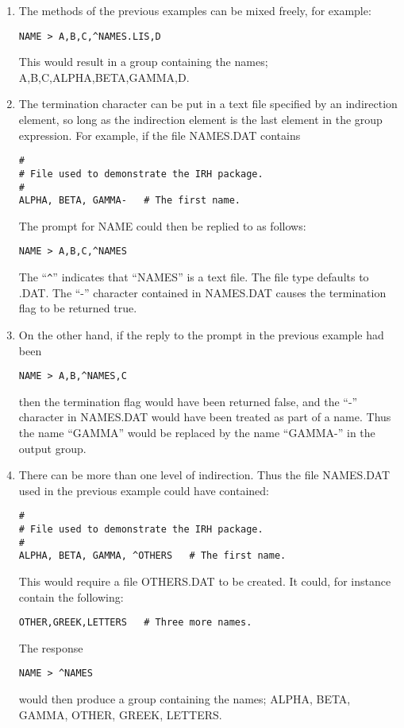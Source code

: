 \begin{enumerate}
\item The methods of the previous examples can be mixed freely, for example:
\begin{verbatim}
NAME > A,B,C,^NAMES.LIS,D
\end{verbatim}
This would result in a group containing the names; A,B,C,ALPHA,BETA,GAMMA,D.

\item The termination character can be put in a text file specified by an 
indirection element, so long as the indirection element is the last element in 
the group expression. For example, if the file NAMES.DAT contains
\begin{verbatim}
#  
# File used to demonstrate the IRH package.
#
ALPHA, BETA, GAMMA-   # The first name.
\end{verbatim}
The prompt for NAME could then be replied to as follows:
\begin{verbatim}
NAME > A,B,C,^NAMES
\end{verbatim}
The ``\verb+^+'' indicates that ``NAMES'' is a text file. The file type defaults to 
.DAT. The ``-'' character contained in NAMES.DAT causes the termination flag to 
be returned true.

\item 
On the other hand, if the reply to the prompt in the previous example had been
\begin{verbatim}
NAME > A,B,^NAMES,C
\end{verbatim}
then the termination flag would have been returned false, and the ``-'' 
character in NAMES.DAT would have been treated as part of a name. Thus the
name ``GAMMA'' would be replaced by the name ``GAMMA-'' in the output group.

\item 
There can be more than one level of indirection. Thus the file NAMES.DAT used 
in the previous example could have contained:
\begin{verbatim}
#  
# File used to demonstrate the IRH package.
#
ALPHA, BETA, GAMMA, ^OTHERS   # The first name.
\end{verbatim}

This would require a file OTHERS.DAT to be created. It could, for instance 
contain the following:
\begin{verbatim}
OTHER,GREEK,LETTERS   # Three more names.
\end{verbatim}
The response
\begin{verbatim}
NAME > ^NAMES
\end{verbatim}
would then produce a group containing the names; ALPHA, BETA, GAMMA, OTHER, 
GREEK, LETTERS.


\end{enumerate}
